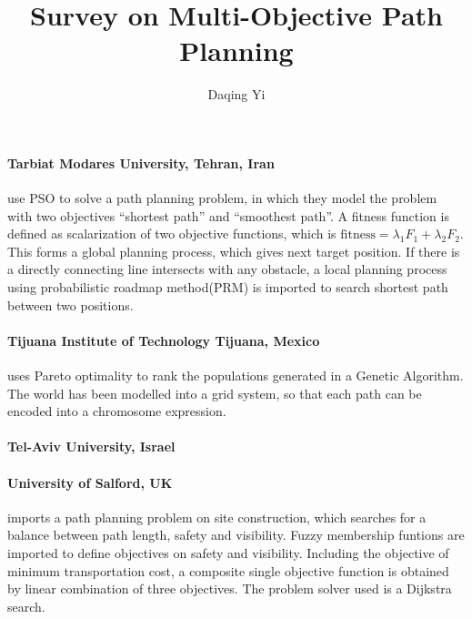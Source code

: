 \documentclass[12pt]{article}
\begin{document}
\title{\textsf{Survey on Multi-Objective Path Planning}}
\author{\textsf{Daqing Yi}}
\date{\textsf{}}

\maketitle

\paragraph{\textbf{Tarbiat Modares University, Tehran, Iran}}
\cite{masehian2010multi2} \cite{masehian2010multi} use PSO to solve a path planning problem, in which they model the problem with two objectives ``shortest path'' and ``smoothest path''. A fitness function is defined as scalarization of two objective functions, which is $ \mbox{fitness} = \lambda_{1} F_{1} + \lambda_{2} F_{2} $. This forms a global planning process, which gives next target position. If there is a directly connecting line intersects with any obstacle, a local planning process using probabilistic roadmap method(PRM) is imported to search shortest path between two positions. 

\paragraph{\textbf{Tijuana Institute of Technology Tijuana, Mexico}}
\cite{castillo2007multiple} uses Pareto optimality to rank the populations generated in a Genetic Algorithm. The world has been modelled into a grid system, so that each path can be encoded into a chromosome expression.

\paragraph{\textbf{Tel-Aviv University, Israel}}
\cite{avigad2009interactive} 

\cite{moshaiov2004concept}

\cite{moshaiov2007extended} 

\cite{avigad2007sequential}

\paragraph{\textbf{University of Salford, UK}}
\cite{soltani2004fuzzy} imports a path planning problem on site construction, which searches for a balance between path length, safety and visibility. Fuzzy membership funtions are imported to define objectives on safety and visibility. Including the objective of minimum transportation cost, a composite single objective function is obtained by linear combination of three objectives. The problem solver used is a Dijkstra search.
\end{document}
